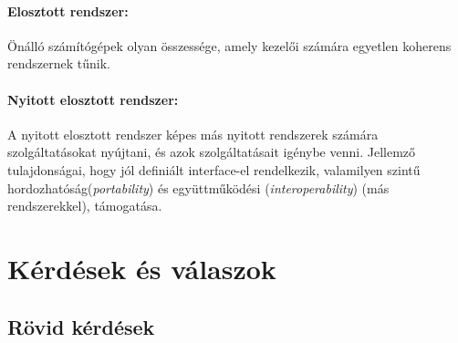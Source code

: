 \documentclass[twoside, a4paper, 12pt]{article}
\begin{document}
    \paragraph{Elosztott rendszer:}
    Önálló számítógépek olyan összessége, amely kezelői számára egyetlen
    koherens rendszernek tűnik.
    \paragraph{Nyitott elosztott rendszer:}
    A nyitott elosztott rendszer képes más nyitott rendszerek számára
    szolgáltatásokat nyújtani, és azok szolgáltatásait igénybe venni.
    Jellemző tulajdonságai, hogy jól definiált interface-el rendelkezik,
    valamilyen szintű hordozhatóság(\textit{portability}) és
    együttműködési (\textit{interoperability}) (más
    rendszerekkel), támogatása. 
    \section{Kérdések és válaszok}
    \subsection{Rövid kérdések}
\end{document}
